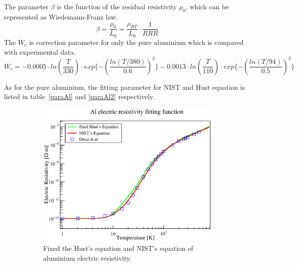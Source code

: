 The parameter $\beta$ is the function of the residual resistivity $\rho_0$, which can be represented as Wiedemann-Franz law.
\begin{equation}
 \beta = \frac{\rho_0}{L_0} = \frac{\rho_{RT}}{L_0} \cdot \frac{1}{RRR}
\end{equation}
The $W_c$ is correction parameter for only the pure aluminium which is compared with experimental data.
\begin{equation}
 W_c = -0.0005 \cdot ln(\frac{T}{330}) \cdot exp\{-(\frac{ln(T/380)}{0.6})^2\} -0.0013 \cdot ln(\frac{T}{110}) \cdot exp\{-(\frac{ln(T/94)}{0.5})^2\}
\end{equation}

As for the pure aluminium, the fitting parameter for NIST and Hust equation is listed in table~\ref{paraAl} and \ref{paraAl2} respectively.
  \begin{figure}[H]
   \begin{subfigure}{3.1in}
	\centering
    \includegraphics[scale=0.45]{chapter5/fig/alres1.eps}
	\caption{Fixed the Hust's equation and NIST's equation of aluminium electric resistivity.}
    \label{4alres}
   \end{subfigure}
   \quad
   \begin{subfigure}{3.1in}
    \centering

\end{subfigure}
\end{figure}
